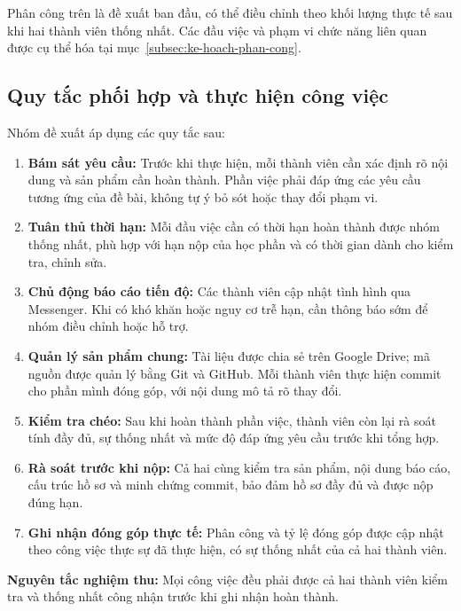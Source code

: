 Phân công trên là đề xuất ban đầu, có thể điều chỉnh theo khối lượng thực tế
sau khi hai thành viên thống nhất. Các đầu việc và phạm vi chức năng liên quan
được cụ thể hóa tại mục~\ref{subsec:ke-hoach-phan-cong}.

\clearpage
\subsection{Quy tắc phối hợp và thực hiện công việc}

Nhóm đề xuất áp dụng các quy tắc sau:

\begin{enumerate}
  \item \textbf{Bám sát yêu cầu:}
    Trước khi thực hiện, mỗi thành viên cần xác định rõ nội dung và sản phẩm
    cần hoàn thành. Phần việc phải đáp ứng các yêu cầu tương ứng của đề bài,
    không tự ý bỏ sót hoặc thay đổi phạm vi.

  \item \textbf{Tuân thủ thời hạn:}
    Mỗi đầu việc cần có thời hạn hoàn thành được nhóm thống nhất, phù hợp
    với hạn nộp của học phần và có thời gian dành cho kiểm tra, chỉnh sửa.

  \item \textbf{Chủ động báo cáo tiến độ:}
    Các thành viên cập nhật tình hình qua Messenger. Khi có khó khăn hoặc
    nguy cơ trễ hạn, cần thông báo sớm để nhóm điều chỉnh hoặc hỗ trợ.

  \item \textbf{Quản lý sản phẩm chung:}
    Tài liệu được chia sẻ trên Google Drive; mã nguồn được quản lý bằng
    Git và GitHub. Mỗi thành viên thực hiện commit cho phần mình đóng góp,
    với nội dung mô tả rõ thay đổi.

  \item \textbf{Kiểm tra chéo:}
    Sau khi hoàn thành phần việc, thành viên còn lại rà soát tính đầy đủ,
    sự thống nhất và mức độ đáp ứng yêu cầu trước khi tổng hợp.

  \item \textbf{Rà soát trước khi nộp:}
    Cả hai cùng kiểm tra sản phẩm, nội dung báo cáo, cấu trúc hồ sơ và
    minh chứng commit, bảo đảm hồ sơ đầy đủ và được nộp đúng hạn.

  \item \textbf{Ghi nhận đóng góp thực tế:}
    Phân công và tỷ lệ đóng góp được cập nhật theo công việc thực sự đã
    thực hiện, có sự thống nhất của cả hai thành viên.
\end{enumerate}

\noindent\textbf{Nguyên tắc nghiệm thu:}
Mọi công việc đều phải được cả hai thành viên kiểm tra và thống nhất
công nhận trước khi ghi nhận hoàn thành.
